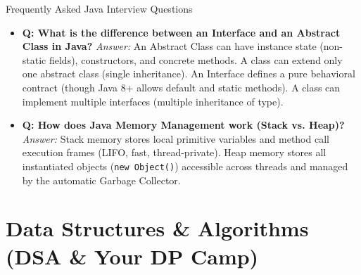 \documentclass[11pt,a4paper]{article}
\begin{document}
\begin{ansbox}{Frequently Asked Java Interview Questions}
\begin{itemize}
    \item \textbf{Q: What is the difference between an Interface and an Abstract Class in Java?}
    \textit{Answer:} An Abstract Class can have instance state (non-static fields), constructors, and concrete methods. A class can extend only one abstract class (single inheritance). An Interface defines a pure behavioral contract (though Java 8+ allows default and static methods). A class can implement multiple interfaces (multiple inheritance of type).
    \item \textbf{Q: How does Java Memory Management work (Stack vs. Heap)?}
    \textit{Answer:} Stack memory stores local primitive variables and method call execution frames (LIFO, fast, thread-private). Heap memory stores all instantiated objects (\texttt{new Object()}) accessible across threads and managed by the automatic Garbage Collector.
\end{itemize}
\end{ansbox}

\section{Data Structures \& Algorithms (DSA \& Your DP Camp)}
\end{document}
